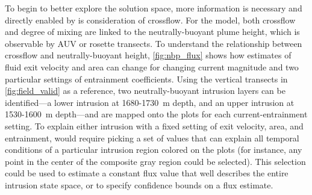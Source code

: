 To begin to better explore the solution space, more information is necessary and directly enabled by \PHUMES is consideration of crossflow. For the \PHUMES model, both crossflow and degree of mixing are linked to the neutrally-buoyant plume height, which is observable by AUV or rosette transects. To understand the relationship between crossflow and neutrally-buoyant height, \cref{fig:nbp_flux} shows how estimates of fluid exit velocity and area can change for changing current magnitude and two particular settings of entrainment coefficients. Using the vertical transects in \cref{fig:field_valid} as a reference, two neutrally-buoyant intrusion layers can be identified---a lower intrusion at 1680-\SI{1730}{\meter} depth, and an upper intrusion at 1530-\SI{1600}{\meter} depth---and are mapped onto the plots for each current-entrainment setting. To explain either intrusion with a fixed setting of exit velocity, area, and entrainment, would require picking a set of values that can explain all temporal conditions of a particular intrusion region colored on the plots (for instance, any point in the center of the composite gray region could be selected). This selection could be used to estimate a constant flux value that well describes the entire intrusion state space, or to specify confidence bounds on a flux estimate.

